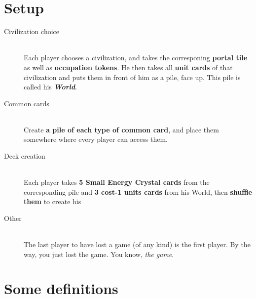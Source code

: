 \documentclass[a4paper]{article}
\begin{document}
\newpage
\section{Setup}

    \begin{description}
        \item[Civilization choice] \hfill \\
            Each player chooses a civilization, and takes the corresponing \textbf{portal tile} as well as \textbf{occupation tokens}.
            He then takes all \textbf{unit cards} of that civilization and puts them in front of him as a pile, face up.
            This pile is called his \textit{\textbf{World}}.
        \item[Common cards] \hfill \\
            Create \textbf{a pile of each type of common card}, and place them somewhere where every player can access them.
        \item[Deck creation] \hfill \\
            Each player takes \textbf{5 Small Energy Crystal cards} from the corresponding pile and
            \textbf{3 cost-1 units cards} from his World, then \textbf{shuffle them} to create his
        \item[Other] \hfill \\
            The last player to have lost a game (of any kind) is the first player.
            By the way, you just lost the game. You know, \textit{the game}.
    \end{description}


\section{Some definitions}
\end{document}
